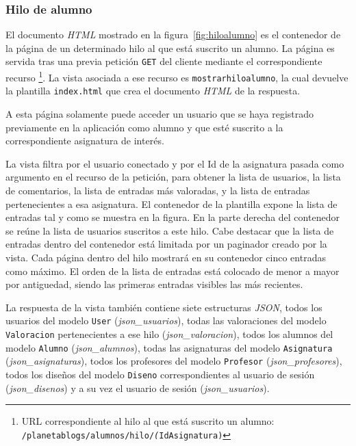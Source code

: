 \documentclass[a4paper, 12pt]{book}
\begin{document}
\subsubsection{Hilo de alumno} 
\label{sec:hiloalumno}
El documento \textit{HTML} mostrado en la figura~\ref{fig:hiloalumno} es el contenedor de la p\'agina de un determinado hilo al que est\'a suscrito un alumno. 
La p\'agina es servida tras una previa petici\'on \texttt{GET} del cliente mediante el correspondiente recurso \footnote{URL correspondiente al hilo al que est\'a
suscrito un alumno: \texttt{/planetablogs/alumnos/hilo/\textit(IdAsignatura)}}. La vista asociada a ese recurso es \texttt{mostrarhiloalumno}, la cual 
devuelve la plantilla \texttt{index.html} que crea el documento \textit{HTML} de la respuesta.

A esta p\'agina solamente puede acceder un usuario que se haya registrado previamente en la aplicaci\'on como alumno y que est\'e suscrito a la
correspondiente asignatura de inter\'es.

La vista filtra por el usuario conectado y por el Id de la asignatura pasada como argumento en el recurso de la petici\'on, para obtener la lista de 
usuarios, la lista de comentarios, la lista de entradas m\'as valoradas, y la lista de entradas pertenecientes a esa asignatura. 
El contenedor de la plantilla expone la lista de entradas tal y como se muestra en la figura. En la parte derecha del contenedor se re\'une la lista de 
usuarios suscritos a este hilo. Cabe destacar que la lista de entradas dentro del contenedor est\'a limitada por un paginador creado por la vista. Cada 
p\'agina dentro del hilo mostrar\'a en su contenedor cinco entradas como m\'aximo. El orden de la lista de entradas est\'a colocado de menor a mayor por 
antiguedad, siendo las primeras entradas visibles las m\'as recientes.

La respuesta de la vista tambi\'en contiene siete estructuras \textit{JSON}, todos los usuarios del modelo \texttt{User} (\textit{json\_usuarios}), 
todas las valoraciones del modelo \texttt{Valoracion} pertenecientes a ese hilo (\textit{json\_valoracion}), todos los alumnos del modelo \texttt{Alumno} 
(\textit{json\_alumnos}), todas las asignaturas del modelo \texttt{Asignatura} (\textit{json\_asignaturas}), todos los profesores del modelo 
\texttt{Profesor} (\textit{json\_profesores}), todos los dise\~nos del modelo \texttt{Diseno} correspondientes al usuario de sesi\'on 
(\textit{json\_disenos}) y a su vez el usuario de sesi\'on (\textit{json\_usuarios}).
\end{document}
